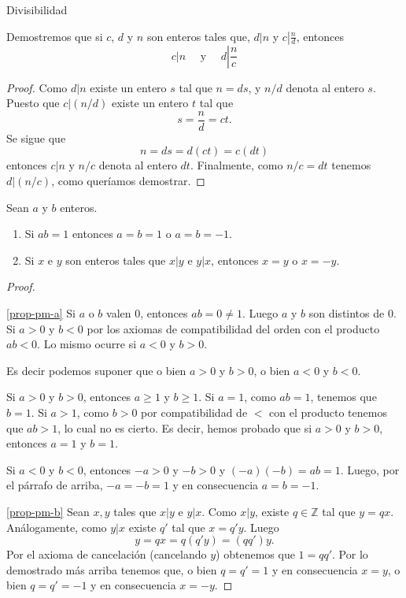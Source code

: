 \begin{section}{Divisibilidad}
\begin{ejemplo*} Demostremos que si $c$, $d$ y $n$ son enteros tales
que, $d|n$ y $c\left|\frac{n}{d}\right.$, entonces
$$ c|n \quad\text{ y }\quad d\left|\frac{n}{c}\right.$$
\end{ejemplo*}
\begin{proof} Como $d|n$ existe un entero $s$ tal que $n=ds$, y
$n/d$ denota al entero $s$. Puesto que $c|(n/d)$ existe un entero
$t$ tal que
$$s=\frac{n}{d} =ct.
$$
Se sigue que
$$
n=ds=d(ct)=c(dt)$$
 entonces $c|n$ y $n/c$ denota al entero $dt$. Finalmente, como
$n/c=dt$ tenemos $d|(n/c)$, como queríamos demostrar.
\end{proof}

\begin{proposicion}\label{pm} Sean $a$ y $b$ enteros.
\begin{enumerate}[label=\textit{\alph*)}]
\item \label{prop-pm-a} Si  $ab=1$ entonces $a=b=1$ o $a=b=-1$. 
\item \label{prop-pm-b}Si $x$ e $y$ son enteros tales que $x|y$ e $y|x$, entonces $x=y$ o $x=-y$.
\end{enumerate}
\end{proposicion}
\begin{proof}
\

\noindent \ref{prop-pm-a} Si $a$ o $b$ valen $0$, entonces $ab=0 \not=1$. Luego $a$ y $b$ son distintos de $0$. Si $a>0$ y $b<0$ por los axiomas de compatibilidad del orden con el producto $ab<0$. Lo mismo ocurre si $a<0$ y $b>0$.

Es decir podemos suponer que o bien $a>0$ y $b>0$, o bien $a<0$ y $b<0$. 

Si  $a>0$ y $b>0$, entonces  $a\ge 1$ y $b\ge 1$. Si $a=1$, como $ab =1$, tenemos que $b = 1$. Si $a>1$, como  $b>0$ por compatibilidad de $<$ con el producto tenemos que $ab>1$, lo cual no es cierto. Es decir, hemos probado que si  $a>0$ y $b>0$, entonces $a=1$ y $b=1$.

Si  $a<0$ y $b<0$, entonces   $-a>0$ y $-b>0$ y $(-a)(-b) = ab =1$. Luego, por el párrafo de arriba, $-a=-b=1$ y en consecuencia $a=b=-1$.

\vskip 0.1cm

\noindent \ref{prop-pm-b} Sean $x,y$ tales que  $x|y$ e $y|x$. Como $x|y$, existe $q \in \mathbb Z$ tal que $y = qx$. Análogamente, como $y|x$ existe $q'$ tal que $x = q'y$. Luego
$$y = qx = q(q'y) = (qq')y.$$
Por el axioma de cancelación (cancelando $y$) obtenemos que $1 = qq'$. Por lo demostrado más arriba tenemos que, o bien $q=q'=1$ y en consecuencia $x=y$, o bien $q=q'=-1$ y en consecuencia $x=-y$. 
\end{proof}


\end{section}
